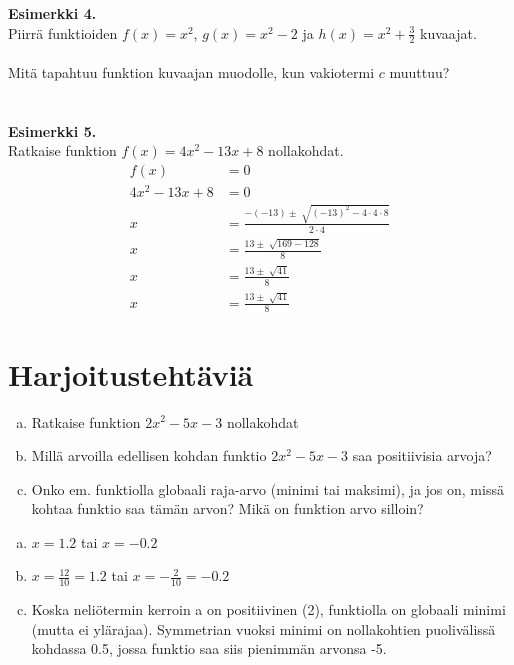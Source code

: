 \textbf{Esimerkki 4.} \\
Piirrä funktioiden $f(x)=x^2$, $g(x)=x^2-2$ ja $h(x)=x^2+\frac{3}{2}$ kuvaajat. \\ \\
Mitä tapahtuu funktion kuvaajan muodolle, kun vakiotermi $c$ muuttuu? \\ \\

\missingfigure \\

\textbf{Esimerkki 5.} \\
Ratkaise funktion $f(x)=4x^2-13x+8$ nollakohdat.
\begin{align*}
f(x)&=0 \\
4x^2-13x+8&=0 \\
x&=\frac{-(-13) \pm \sqrt[]{(-13)^2-4 \cdot 4 \cdot 8}}{2 \cdot 4} \\
x&=\frac{13 \pm \sqrt[]{169-128}}{8} \\
x&=\frac{13 \pm \sqrt[]{41}}{8} \\
x&=\frac{13 \pm \sqrt[]{41}}{8}
\end{align*}

\section{Harjoitustehtäviä}

\begin{tehtava}
  \begin{enumerate}[a)]
    \item Ratkaise funktion $2x^2 - 5x - 3$ nollakohdat
    \item Millä arvoilla edellisen kohdan funktio $2x^2 - 5x - 3$ saa positiivisia arvoja?
    \item Onko em. funktiolla globaali raja-arvo (minimi tai maksimi), ja jos on, missä kohtaa funktio saa tämän arvon? Mikä on funktion arvo silloin?
  \end{enumerate}

  \begin{vastaus}
    \begin{enumerate}[a)]
      \item $x = 1.2$ tai $x = -0.2$
      \item $x = \frac{12}{10} = 1.2$ tai $x = -\frac{2}{10} = -0.2$
      \item Koska neliötermin kerroin a on positiivinen (2), funktiolla on globaali minimi (mutta ei ylärajaa). Symmetrian vuoksi minimi on nollakohtien puolivälissä kohdassa 0.5, jossa funktio saa siis pienimmän arvonsa -5.
    \end{enumerate}
  \end{vastaus}
\end{tehtava}